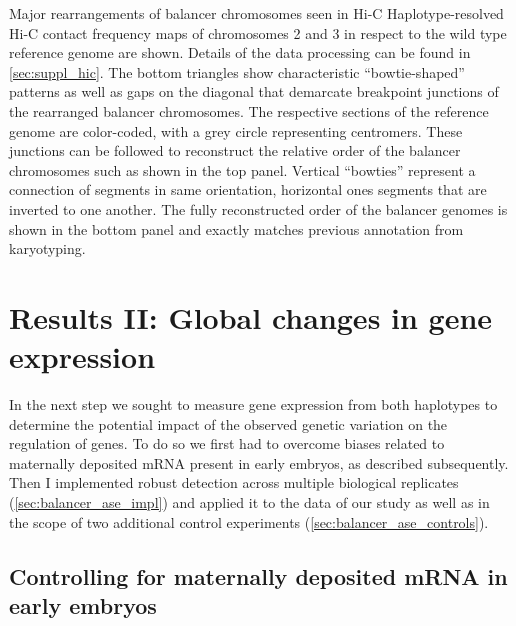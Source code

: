     {Major rearrangements of balancer chromosomes seen in Hi-C}{
     Haplotype-resolved Hi-C contact frequency maps of chromosomes 2 and 3 in
    respect to the wild type reference genome are shown. Details of the data
    processing can be found in \cref{sec:suppl_hic}. The bottom triangles show
    characteristic ``bowtie-shaped'' patterns as well as gaps on the diagonal
    that demarcate breakpoint junctions of the rearranged balancer chromosomes.
    The respective sections of the reference genome are color-coded, with a grey
    circle representing centromers.
     These junctions can be followed to reconstruct the relative order of the
    balancer chromosomes such as shown in the top panel. Vertical ``bowties''
    represent a connection of segments in same orientation, horizontal
    ones segments that are inverted to one another.
     The fully reconstructed order of the balancer genomes is shown in the bottom
    panel and exactly matches previous annotation from
    karyotyping.}
\FloatBarrier












\section{Results II: Global changes in gene expression}
\label{sec:balancer_ase}

In the next step we sought to measure gene expression from both haplotypes to
determine the potential impact of the observed genetic variation on the
regulation of genes. To do so we first had to overcome biases related to
maternally deposited mRNA present in early embryos, as described subsequently.
Then I implemented robust \ase detection across multiple biological replicates
(\cref{sec:balancer_ase_impl}) and applied it to the data of our study as well
as in the scope of two additional control experiments
(\cref{sec:balancer_ase_controls}).




\subsection{Controlling for maternally deposited mRNA in early embryos}
\label{sec:balancer_maternal_rna}

